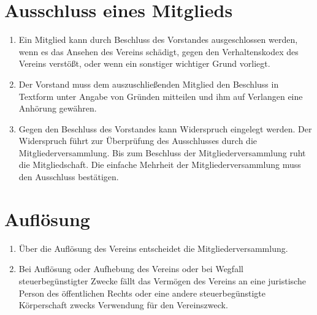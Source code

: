 \documentclass[a4paper, 12pt]{scrartcl}
\begin{document}
\section{Ausschluss eines Mitglieds}
\begin{enumerate}
  \item Ein Mitglied kann durch Beschluss des Vorstandes ausgeschlossen werden, wenn es das Ansehen des Vereins schädigt, gegen den Verhaltenskodex des Vereins verstößt, oder wenn ein sonstiger wichtiger Grund vorliegt.
  \item Der Vorstand muss dem auszuschließenden Mitglied den Beschluss in Textform unter Angabe von Gründen mitteilen und ihm auf Verlangen eine Anhörung gewähren.
  \item Gegen den Beschluss des Vorstandes kann Widerspruch eingelegt werden. Der Widerspruch führt zur Überprüfung des Ausschlusses durch die Mitgliederversammlung. Bis zum Beschluss der Mitgliederversammlung ruht die Mitgliedschaft. Die einfache Mehrheit der Mitgliederversammlung muss den Ausschluss bestätigen.
\end{enumerate}

\section{Auflösung}
\begin{enumerate}
  \item Über die Auflösung des Vereins entscheidet die Mitgliederversammlung.
  \item Bei Auflösung oder Aufhebung des Vereins oder bei Wegfall steuerbegünstigter Zwecke fällt das Vermögen des Vereins an eine juristische Person des öffentlichen Rechts oder eine andere steuerbegünstigte Körperschaft zwecks Verwendung für den Vereinszweck.
\end{enumerate}
\end{document}
